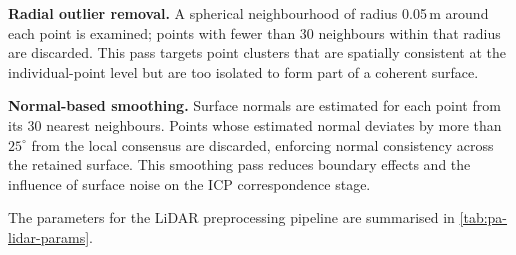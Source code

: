 \textbf{Radial outlier removal.} A spherical neighbourhood of radius 0.05\,m around each point is examined; points with fewer than 30 neighbours within that radius are discarded.
This pass targets point clusters that are spatially consistent at the individual-point level but are too isolated to form part of a coherent surface.

\textbf{Normal-based smoothing.} Surface normals are estimated for each point from its 30 nearest neighbours. Points whose estimated normal deviates by more than $25^{\circ}$ from the local consensus are discarded, enforcing normal consistency across the retained surface. This smoothing pass reduces boundary effects and the influence of surface noise on the ICP correspondence stage.

The parameters for the LiDAR preprocessing pipeline are summarised in \cref{tab:pa-lidar-params}.

